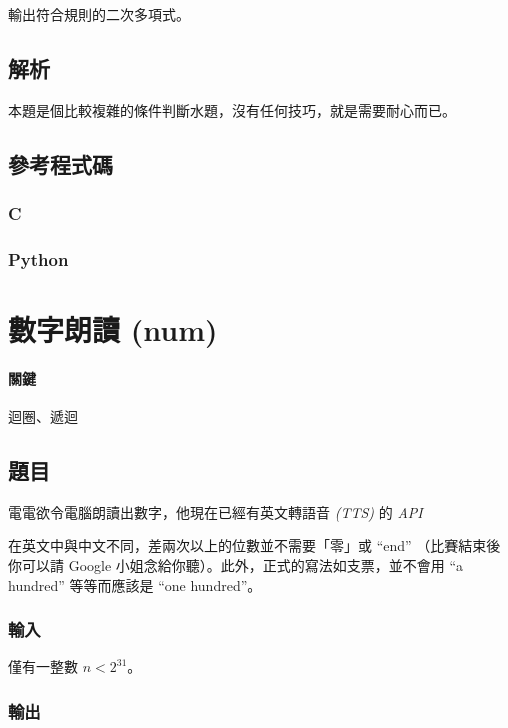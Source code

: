 \documentclass[a4paper,10pt]{article}
\begin{document}
輸出符合規則的二次多項式。

\subsection{解析}

本題是個比較複雜的條件判斷水題，沒有任何技巧，就是需要耐心而已。

\subsection{參考程式碼}

\subsubsection{C}



\subsubsection{Python}



\section{數字朗讀 (num)}

\paragraph{關鍵} 迴圈、遞迴

\subsection{題目}

電電欲令電腦朗讀出數字，他現在已經有英文轉語音 \textit{(TTS)} 的 \textit{API} 

在英文中與中文不同，差兩次以上的位數並不需要「零」或 ``end'' （比賽結束後你可以請 Google 小姐念給你聽）。此外，正式的寫法如支票，並不會用 ``a hundred'' 等等而應該是 ``one hundred''。

\subsubsection{輸入}

僅有一整數 $n < 2^{31}$。

\subsubsection{輸出}
\end{document}
